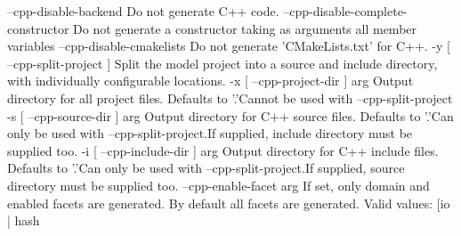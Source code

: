 \documentclass{book}
\begin{document}
\begin{pseudocode}[backgroundcolor=\color{lightgray}]
--cpp-disable-backend                 Do not generate C++ code.
--cpp-disable-complete-constructor    Do not generate a constructor taking as
                                      arguments all member variables
--cpp-disable-cmakelists              Do not generate 'CMakeLists.txt' for
                                      C++.
-y [ --cpp-split-project ]            Split the model project into a source
                                      and include directory, with
                                      individually configurable locations.
-x [ --cpp-project-dir ] arg          Output directory for all project files.
                                      Defaults to '.'Cannot be used with
                                      --cpp-split-project
-s [ --cpp-source-dir ] arg           Output directory for C++ source files.
                                      Defaults to '.'Can only be used with
                                      --cpp-split-project.If supplied,
                                      include directory must be supplied too.
-i [ --cpp-include-dir ] arg          Output directory for C++ include files.
                                      Defaults to '.'Can only be used with
                                      --cpp-split-project.If supplied, source
                                      directory must be supplied too.
--cpp-enable-facet arg                If set, only domain and enabled facets
                                      are generated. By default all facets
                                      are generated. Valid values: [io | hash


\end{pseudocode}
\end{document}
